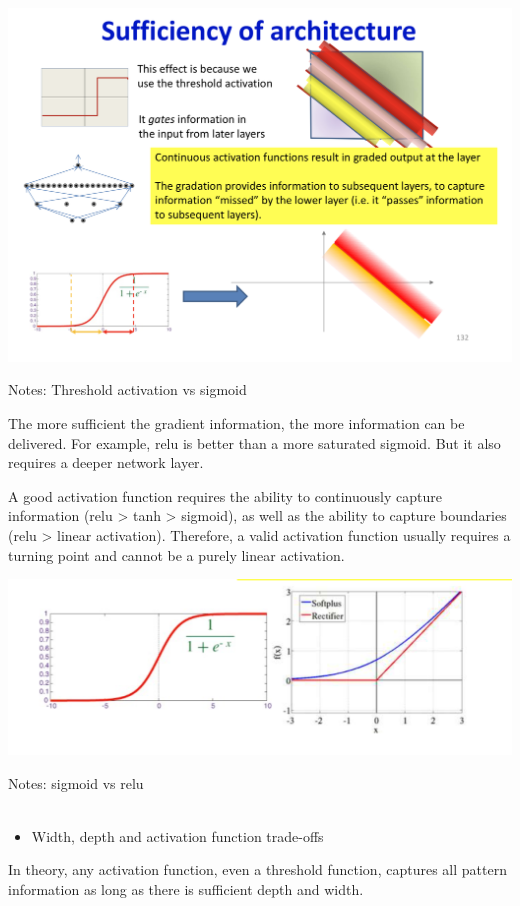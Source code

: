 \documentclass{article}
\begin{document}
	\includegraphics[scale=0.2]{39.png}
	
	Notes: Threshold activation vs sigmoid
	
	The more sufficient the gradient information, the more information can be delivered. For example, relu is better than a more saturated sigmoid. But it also requires a deeper network layer.
	
	A good activation function requires the ability to continuously capture information (relu > tanh > sigmoid), as well as the ability to capture boundaries (relu > linear activation). Therefore, a valid activation function usually requires a turning point and cannot be a purely linear activation.
	
	\includegraphics[scale=0.2]{40.png}
	
	Notes: sigmoid vs relu \\ \\
	
	
	\begin{itemize}
		\item Width, depth and activation function trade-offs
	\end{itemize}
	
	In theory, any activation function, even a threshold function, captures all pattern information as long as there is sufficient depth and width.
	
\end{document}
